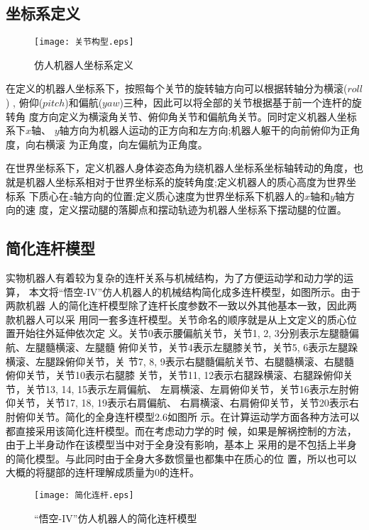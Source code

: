 \subsection{坐标系定义}
\begin{figure}[htbp]
    \centering
    \texttt{[image: 关节构型.eps]}
    \caption{\label{fig:coordination}仿人机器人坐标系定义}
\end{figure}
在定义的机器人坐标系下，按照每个关节的旋转轴方向可以根据转轴分为横滚($roll$) ,
俯仰($pitch$)和偏航($yaw$)三种，因此可以将全部的关节根据基于前一个连杆的旋转角
度方向定义为横滚角关节、俯仰角关节和偏航角关节。同时定义机器人坐标系下$x$轴、
$y$轴方向为机器人运动的正方向和左方向;机器人躯干的向前俯仰为正角度，向右横滚
为正角度，向左偏航为正角度。

在世界坐标系下，定义机器人身体姿态角为绕机器人坐标系坐标轴转动的角度，也
就是机器人坐标系相对于世界坐标系的旋转角度;定义机器人的质心高度为世界坐标系
下质心在$z$轴方向的位置;定义质心速度为世界坐标系下机器人的$x$轴和$y$轴方向的速
度，定义摆动腿的落脚点和摆动轨迹为机器人坐标系下摆动腿的位置。
\subsection{简化连杆模型}
实物机器人有着较为复杂的连杆关系与机械结构，为了方便运动学和动力学的运算，
本文将“悟空-IV”仿人机器人的机械结构简化成多连杆模型，如图所示。由于两款机器
人的简化连杆模型除了连杆长度参数不一致以外其他基本一致，因此两款机器人可以采
用同一套多连杆模型。关节命名的顺序就是从上文定义的质心位置开始往外延伸依次定
义。关节0表示腰偏航关节，关节1, 2, 3分别表示左腿髓偏航、左腿髓横滚、左腿髓
俯仰关节，关节4表示左腿膝关节，关节5, 6表示左腿跺横滚、左腿跺俯仰关节，关
节7,  8,   9表示右腿髓偏航关节、右腿髓横滚、右腿髓俯仰关节，关节10表示右腿膝
关节，关节11, 12表示右腿跺横滚、右腿跺俯仰关节，关节13, 14, 15表示左肩偏航、
左肩横滚、左肩俯仰关节，关节16表示左肘俯仰关节，关节17, 18, 19表示右肩偏航、
右肩横滚、右肩俯仰关节，关节20表示右肘俯仰关节。简化的全身连杆模型2.6如图所
示。在计算运动学方面各种方法可以都直接采用该简化连杆模型。而在考虑动力学的时
候，如果是解祸控制的方法，由于上半身动作在该模型当中对于全身没有影响，基本上
采用的是不包括上半身的简化模型。与此同时由于全身大多数惯量也都集中在质心的位
置，所以也可以大概的将腿部的连杆理解成质量为0的连杆。
\begin{figure}[htbp]
    \centering
    \texttt{[image: 简化连杆.eps]}
    \caption{\label{fig:link_model}“悟空-IV”仿人机器人的简化连杆模型}
\end{figure}
